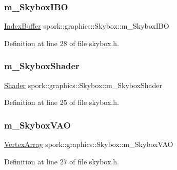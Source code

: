 \subsubsection{\texorpdfstring{m\+\_\+\+Skybox\+I\+BO}{m\_SkyboxIBO}}
{\footnotesize\ttfamily \hyperlink{classspork_1_1graphics_1_1_index_buffer}{Index\+Buffer} spork\+::graphics\+::\+Skybox\+::m\+\_\+\+Skybox\+I\+BO\hspace{0.3cm}{\ttfamily [private]}}



Definition at line 28 of file skybox.\+h.

\mbox{\label{classspork_1_1graphics_1_1_skybox_ad3c7df911441de454ef4e3fd9872185c}} 
\subsubsection{\texorpdfstring{m\+\_\+\+Skybox\+Shader}{m\_SkyboxShader}}
{\footnotesize\ttfamily \hyperlink{classspork_1_1graphics_1_1_shader}{Shader} spork\+::graphics\+::\+Skybox\+::m\+\_\+\+Skybox\+Shader\hspace{0.3cm}{\ttfamily [private]}}



Definition at line 25 of file skybox.\+h.

\mbox{\label{classspork_1_1graphics_1_1_skybox_aa660e5dcfb268f19cc4e877b76fd84de}} 
\subsubsection{\texorpdfstring{m\+\_\+\+Skybox\+V\+AO}{m\_SkyboxVAO}}
{\footnotesize\ttfamily \hyperlink{classspork_1_1graphics_1_1_vertex_array}{Vertex\+Array} spork\+::graphics\+::\+Skybox\+::m\+\_\+\+Skybox\+V\+AO\hspace{0.3cm}{\ttfamily [private]}}



Definition at line 27 of file skybox.\+h.

